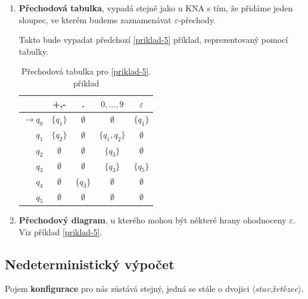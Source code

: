 \documentclass[10pt, a4paper, titlepage]{article}
\theoremstyle{note}
\begin{document}
\begin{enumerate}

\item
\textbf{Přechodová tabulka}, vypadá stejně jako u KNA s tím, že přidáme jeden sloupec, ve kterém budeme zaznamenávat $\varepsilon$-přechody.

Takto bude vypadat předchozí \ref{priklad-5} př\'iklad, reprezentovaný pomocí tabulky.

\begin{table}[h]
\begin{center}
\begin{tabular}{ r || c | c | c | c }                   
   & +,- & . & $0,\ldots,9$ & $\varepsilon$ \\
   \hline
   $ \rightarrow q_{0} $ & $ \lbrace q_{1} \rbrace $ & $ \emptyset $ & $ \emptyset $ & $ \lbrace q_{1} \rbrace $\\
   $ q_{1} $ & $ \lbrace q_{2} \rbrace $ & $ \emptyset $ & $ \lbrace q_{1},q_{2} \rbrace $ & $\emptyset$ \\
   $ q_{2} $ & $ \emptyset $ & $ \emptyset $ & $\lbrace q_{3} \rbrace$ & $ \emptyset $ \\
   $ q_{3} $ & $ \emptyset $ & $ \emptyset $ & $\lbrace q_{3} \rbrace$ & $\lbrace q_{5} \rbrace$ \\
   $ q_{4} $ & $ \emptyset $ & $\lbrace q_{3} \rbrace$ & $\emptyset$ & $ \emptyset $ \\
   $ q_{5} $ & $ \emptyset $ &  $ \emptyset $ & $\emptyset$ & $ \emptyset $ 
\end{tabular}
\end{center}
\caption{Přechodov\'a tabulka pro \ref{priklad-5}. přiklad}
\end{table}

\item
\textbf{Přechodový diagram}, u kterého mohou být některé hrany ohodnoceny $\varepsilon$. Viz příklad \ref{priklad-5}.

\end{enumerate}

\subsection{Nedeterministický výpočet}
Pojem \textbf{konfigurace} pro nás zůstává stejný, jedná se stále o dvojici $\langle \textit{stav,řetězec} \rangle$.
\end{document}
